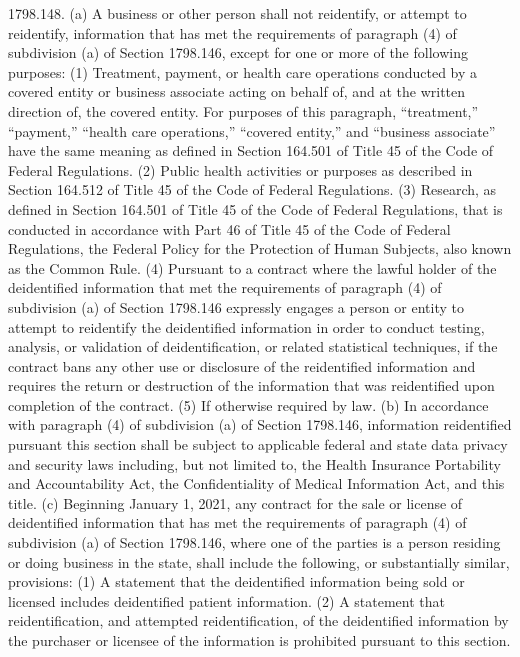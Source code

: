 1798.148.  (a) A business or other person shall not reidentify, or attempt to reidentify, information that has met the requirements of paragraph (4) of subdivision (a) of Section 1798.146, except for one or more of the following purposes:
(1) Treatment, payment, or health care operations conducted by a covered entity or business associate acting on behalf of, and at the written direction of, the covered entity. For purposes of this paragraph, “treatment,” “payment,” “health care operations,” “covered entity,” and “business associate” have the same meaning as defined in Section 164.501 of Title 45 of the Code of Federal Regulations.
(2) Public health activities or purposes as described in Section 164.512 of Title 45 of the Code of Federal Regulations.
(3) Research, as defined in Section 164.501 of Title 45 of the Code of Federal Regulations, that is conducted in accordance with Part 46 of Title 45 of the Code of Federal Regulations, the Federal Policy for the Protection of Human Subjects, also known as the Common Rule.
(4) Pursuant to a contract where the lawful holder of the deidentified information that met the requirements of paragraph (4) of subdivision (a) of Section 1798.146 expressly engages a person or entity to attempt to reidentify the deidentified information in order to conduct testing, analysis, or validation of deidentification, or related statistical techniques, if the contract bans any other use or disclosure of the reidentified information and requires the return or destruction of the information that was reidentified upon completion of the contract.
(5) If otherwise required by law.
(b) In accordance with paragraph (4) of subdivision (a) of Section 1798.146, information reidentified pursuant this section shall be subject to applicable federal and state data privacy and security laws including, but not limited to, the Health Insurance Portability and Accountability Act, the Confidentiality of Medical Information Act, and this title.
(c) Beginning January 1, 2021, any contract for the sale or license of deidentified information that has met the requirements of paragraph (4) of subdivision (a) of Section 1798.146, where one of the parties is a person residing or doing business in the state, shall include the following, or substantially similar, provisions:
(1) A statement that the deidentified information being sold or licensed includes deidentified patient information.
(2) A statement that reidentification, and attempted reidentification, of the deidentified information by the purchaser or licensee of the information is prohibited pursuant to this section.
